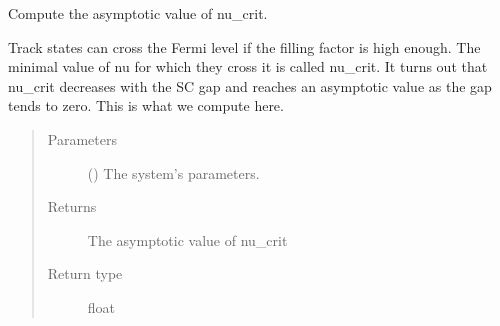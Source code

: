 \documentclass[letterpaper,10pt,english]{sphinxmanual}
\begin{document}

\begin{fulllineitems}
\label{\detokenize{modules:modules.utils.compute_micro_nu_crit_limit}}
\pysigstartsignatures
{}
\pysigstopsignatures
\sphinxAtStartPar
Compute the asymptotic value of nu\_crit.

\sphinxAtStartPar
Track states can cross the Fermi level if the filling factor is high enough.
The minimal value of nu for which they cross it is called nu\_crit.
It turns out that nu\_crit decreases with the SC gap
and reaches an asymptotic value as the gap tends to zero.
This is what we compute here.
\begin{quote}\begin{description}
\item[{Parameters}] \leavevmode
\sphinxAtStartPar
{} () \textendash{} The system’s parameters.

\item[{Returns}] \leavevmode
\sphinxAtStartPar
The asymptotic value of nu\_crit

\item[{Return type}] \leavevmode
\sphinxAtStartPar
float

\end{description}\end{quote}

\end{fulllineitems}

\end{document}
